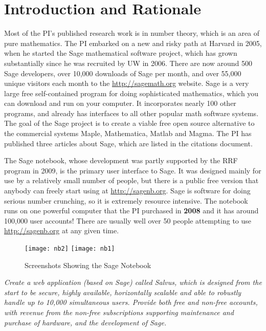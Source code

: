 \documentclass[11pt]{article}
\begin{document}
\section{Introduction and Rationale}


Most of the PI's published research work is in number theory, which is
an area of pure mathematics.  The PI embarked on a new and risky path
at Harvard in 2005, when he started the Sage mathematical software
project, which has grown substantially since he was recruited by UW in
2006.  There are now around 500 Sage developers, over 10,000 downloads
of Sage per month, and over 55,000 unique visitors each month to the
\url{http://sagemath.org} website.  Sage is a very large free
self-contained program for doing sophisticated mathematics, which you
can download and run on your computer.  It incorporates nearly 100
other programs, and already has interfaces to all other popular math
software systems.  The goal of the Sage project is to create a viable
free open source alternative to the commercial systems Maple,
Mathematica, Matlab and Magma.  The PI has published three articles
about Sage, which are listed in the citations document.

The Sage notebook, whose development was partly supported by the RRF
program in 2009, is the primary user interface to Sage.  It was
designed mainly for use by a relatively small number of people, but
there is a public free version that anybody can freely start using at
\url{http://sagenb.org}.  Sage is software for doing serious number
crunching, so it is extremely resource intensive.  The notebook runs
on one powerful computer that the PI purchased in {\bf 2008} and it
has around 100,000 user accounts!  There are usually well over 50
people attempting to use \url{http://sagenb.org} at any given time.

\begin{center}
\begin{figure}[ht]
\hfill
\texttt{[image: nb2]}
\hfill
\texttt{[image: nb1]}
\hfill
\mbox{}
\caption{Screenshots Showing the Sage Notebook\label{fig:sagenb}}
\end{figure}
\end{center}

 {\em Create a web application (based on Sage)
  called Salvus, which is designed from the start to be secure, highly
  available, horizontally scalable and able to robustly handle up to
  10,000 simultaneous users.  Provide both free and non-free accounts,
  with revenue from the non-free subscriptions supporting maintenance
  and purchase of hardware, and the development of Sage.}
\end{document}
